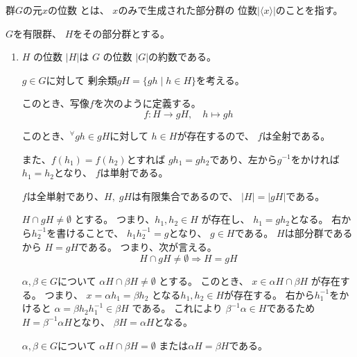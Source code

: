 \documentclass[12pt,b5paper]{ltjsarticle}
\begin{document}
\hrulefill

群$G$の元$x$の位数
とは、
$x$のみで生成された部分群の
位数$\lvert \langle x \rangle \rvert$のことを指す。

\hrulefill

$G$を有限群、
$H$をその部分群とする。

\begin{enumerate}
 \item
      $H$ の位数 $\lvert H \rvert$は
      $G$ の位数 $\lvert G \rvert$の約数である。

      \dotfill

      $g\in G$に対して
      剰余類$gH=\{gh \mid h\in H\}$を考える。

      このとき、写像$f$を次のように定義する。
      \begin{equation}
       f:H\to gH ,\quad h \mapsto gh
      \end{equation}

      このとき、${}^{\forall} gh \in gH$に対して
      $h\in H$が存在するので、
      $f$は全射である。

      また、$f(h_{1})=f(h_{2})$とすれば
      $gh_{1}=gh_{2}$であり、左から$g^{-1}$をかければ
      $h_{1}=h_{2}$となり、
      $f$は単射である。

      $f$は全単射であり、$H,\;gH$は有限集合であるので、
      $\lvert H \rvert = \lvert gH \rvert$である。

      $H \cap gH \ne \emptyset$
      とする。
      つまり、$h_{1},h_{2} \in H$
      が存在し、
      $h_{1}=gh_{2}$となる。
      右から$h_{2}^{-1}$を書けることで、
      $h_{1}h_{2}^{-1}=g$となり、
      $g\in H$である。
      $H$は部分群であるから
      $H = gH$である。
      つまり、次が言える。
      \begin{equation}
       H \cap gH \ne \emptyset
        \Rightarrow H= gH
      \end{equation}

      $\alpha,\beta\in G$について
      $\alpha H \cap \beta H \ne \emptyset$
      とする。
      このとき、
      $x \in \alpha H \cap \beta H$
      が存在する。
      つまり、
      $x=\alpha h_{1} = \beta h_{2}$
      となる$h_{1},h_{2}\in H$が存在する。
      右から$h_{1}^{-1}$をかけると
      $\alpha = \beta h_{2} h_{1}^{-1} \in \beta H$
      である。
      これにより
      $\beta^{-1}\alpha \in H$であるため
      $H = \beta^{-1}\alpha H$となり、
      $\beta H = \alpha H$となる。

      $\alpha,\beta\in G$について
      $\alpha H \cap \beta H = \emptyset$
      または$\alpha H = \beta H$である。


\end{enumerate}
\end{document}
